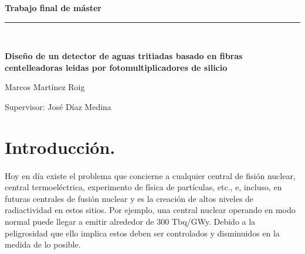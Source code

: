 \documentclass[11pt, a4paper]{article}
\begin{document}
\begin{titlepage}
\begin{center}
\begin{large}
\textbf{{\large Trabajo final de máster}}\\
\rule{80mm}{0.1mm}\\

\end{large}
\vspace*{0.2in}
\begin{Large}
\textbf{Diseño de un detector de aguas tritiadas basado en fibras centelleadoras leidas por fotomultiplicadores de silicio} \\
\end{Large}
\vspace*{2 cm}

\begin{large}
Marcos Martínez Roig\\
\end{large}
\end{center}

\vspace*{0.3in}
\vspace*{0.1in}
\begin{large}
\begin{flushright}
Supervisor: José Díaz Medina\\
\end{flushright}
\end{large}

\end{titlepage}



\tableofcontents 
\newpage


\section {Introducción.}
\paragraph {}
Hoy en día existe el problema que concierne a cualquier central de fisión nuclear, central termoeléctrica,  experimento de física de partículas, etc., e, incluso, en futuras centrales de fusión nuclear y es la creación de altos niveles de radiactividad en estos sitios. Por ejemplo, una central nuclear operando en modo normal puede llegar a emitir alrededor de 300 Tbq/GWy.  Debido a la peligrosidad que ello implica estos deben ser controlados y disminuidos en la medida de lo posible.
\end{document}
